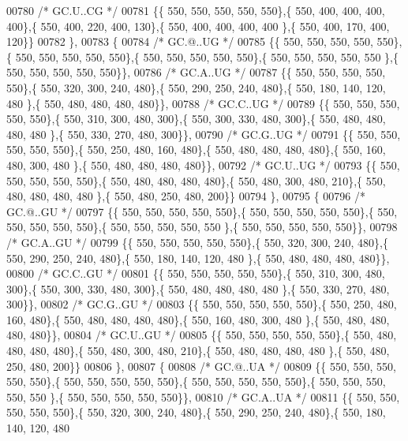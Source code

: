 \begin{DoxyCode}
00780 \textcolor{comment}{/* GC.U..CG */}
00781 \{\{ 550, 550, 550, 550, 550\},\{ 550, 400, 400, 400, 400\},\{ 550, 400, 220, 400, 130\},\{ 550, 400, 400, 400, 400
      \},\{ 550, 400, 170, 400, 120\}\}
00782 \},
00783 \{
00784 \textcolor{comment}{/* GC.@..UG */}
00785 \{\{ 550, 550, 550, 550, 550\},\{ 550, 550, 550, 550, 550\},\{ 550, 550, 550, 550, 550\},\{ 550, 550, 550, 550, 550
      \},\{ 550, 550, 550, 550, 550\}\},
00786 \textcolor{comment}{/* GC.A..UG */}
00787 \{\{ 550, 550, 550, 550, 550\},\{ 550, 320, 300, 240, 480\},\{ 550, 290, 250, 240, 480\},\{ 550, 180, 140, 120, 480
      \},\{ 550, 480, 480, 480, 480\}\},
00788 \textcolor{comment}{/* GC.C..UG */}
00789 \{\{ 550, 550, 550, 550, 550\},\{ 550, 310, 300, 480, 300\},\{ 550, 300, 330, 480, 300\},\{ 550, 480, 480, 480, 480
      \},\{ 550, 330, 270, 480, 300\}\},
00790 \textcolor{comment}{/* GC.G..UG */}
00791 \{\{ 550, 550, 550, 550, 550\},\{ 550, 250, 480, 160, 480\},\{ 550, 480, 480, 480, 480\},\{ 550, 160, 480, 300, 480
      \},\{ 550, 480, 480, 480, 480\}\},
00792 \textcolor{comment}{/* GC.U..UG */}
00793 \{\{ 550, 550, 550, 550, 550\},\{ 550, 480, 480, 480, 480\},\{ 550, 480, 300, 480, 210\},\{ 550, 480, 480, 480, 480
      \},\{ 550, 480, 250, 480, 200\}\}
00794 \},
00795 \{
00796 \textcolor{comment}{/* GC.@..GU */}
00797 \{\{ 550, 550, 550, 550, 550\},\{ 550, 550, 550, 550, 550\},\{ 550, 550, 550, 550, 550\},\{ 550, 550, 550, 550, 550
      \},\{ 550, 550, 550, 550, 550\}\},
00798 \textcolor{comment}{/* GC.A..GU */}
00799 \{\{ 550, 550, 550, 550, 550\},\{ 550, 320, 300, 240, 480\},\{ 550, 290, 250, 240, 480\},\{ 550, 180, 140, 120, 480
      \},\{ 550, 480, 480, 480, 480\}\},
00800 \textcolor{comment}{/* GC.C..GU */}
00801 \{\{ 550, 550, 550, 550, 550\},\{ 550, 310, 300, 480, 300\},\{ 550, 300, 330, 480, 300\},\{ 550, 480, 480, 480, 480
      \},\{ 550, 330, 270, 480, 300\}\},
00802 \textcolor{comment}{/* GC.G..GU */}
00803 \{\{ 550, 550, 550, 550, 550\},\{ 550, 250, 480, 160, 480\},\{ 550, 480, 480, 480, 480\},\{ 550, 160, 480, 300, 480
      \},\{ 550, 480, 480, 480, 480\}\},
00804 \textcolor{comment}{/* GC.U..GU */}
00805 \{\{ 550, 550, 550, 550, 550\},\{ 550, 480, 480, 480, 480\},\{ 550, 480, 300, 480, 210\},\{ 550, 480, 480, 480, 480
      \},\{ 550, 480, 250, 480, 200\}\}
00806 \},
00807 \{
00808 \textcolor{comment}{/* GC.@..UA */}
00809 \{\{ 550, 550, 550, 550, 550\},\{ 550, 550, 550, 550, 550\},\{ 550, 550, 550, 550, 550\},\{ 550, 550, 550, 550, 550
      \},\{ 550, 550, 550, 550, 550\}\},
00810 \textcolor{comment}{/* GC.A..UA */}
00811 \{\{ 550, 550, 550, 550, 550\},\{ 550, 320, 300, 240, 480\},\{ 550, 290, 250, 240, 480\},\{ 550, 180, 140, 120, 480

\end{DoxyCode}
